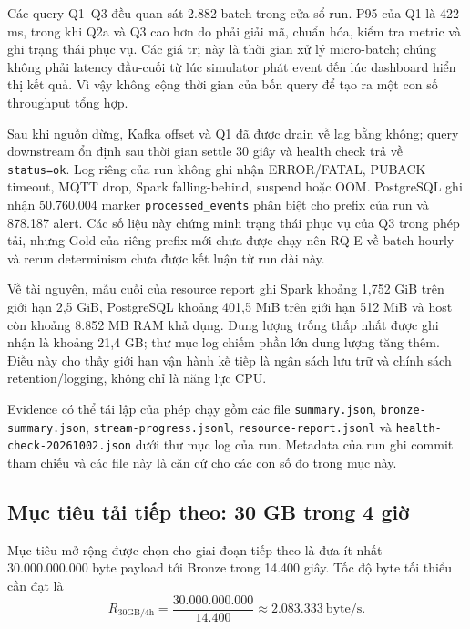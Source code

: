 Các query Q1--Q3 đều quan sát 2.882 batch trong cửa sổ run. P95 của Q1 là
422 ms, trong khi Q2a và Q3 cao hơn do phải giải mã, chuẩn hóa, kiểm tra
metric và ghi trạng thái phục vụ. Các giá trị này là thời gian xử lý
micro-batch; chúng không phải latency đầu-cuối từ lúc simulator phát event
đến lúc dashboard hiển thị kết quả. Vì vậy không cộng thời gian của bốn query
để tạo ra một con số throughput tổng hợp.

Sau khi nguồn dừng, Kafka offset và Q1 đã được drain về lag bằng không; query
downstream ổn định sau thời gian settle 30 giây và health check trả về
\texttt{status=ok}. Log riêng của run không ghi nhận ERROR/FATAL, PUBACK timeout,
MQTT drop, Spark falling-behind, suspend hoặc OOM. PostgreSQL ghi nhận
50.760.004 marker \texttt{processed\_events} phân biệt cho prefix của run và
878.187 alert. Các số liệu này chứng minh trạng thái phục vụ của Q3 trong
phép tải, nhưng Gold của riêng prefix mới chưa được chạy nên RQ-E về batch
hourly và rerun determinism chưa được kết luận từ run dài này.

Về tài nguyên, mẫu cuối của resource report ghi Spark khoảng 1,752 GiB
trên giới hạn 2,5 GiB, PostgreSQL khoảng 401,5 MiB trên giới hạn 512 MiB và
host còn khoảng 8.852 MB RAM khả dụng. Dung lượng trống thấp nhất được ghi
nhận là khoảng 21,4 GB; thư mục log chiếm phần lớn dung lượng tăng thêm.
Điều này cho thấy giới hạn vận hành kế tiếp là ngân sách lưu trữ và chính
sách retention/logging, không chỉ là năng lực CPU.

Evidence có thể tái lập của phép chạy gồm các file
\texttt{summary.json}, \texttt{bronze-summary.json},
\texttt{stream-progress.jsonl}, \texttt{resource-report.jsonl} và
\texttt{health-check-20261002.json} dưới thư mục log của run. Metadata của run ghi
commit tham chiếu và các file này là căn cứ cho các con số đo trong mục này.

\subsection{Mục tiêu tải tiếp theo: 30 GB trong 4 giờ}
\label{subsec:future-30gb}

Mục tiêu mở rộng được chọn cho giai đoạn tiếp theo là đưa ít nhất
30.000.000.000 byte payload tới Bronze trong 14.400 giây. Tốc độ byte tối
thiểu cần đạt là
\begin{equation}
  R_{30\mathrm{GB}/4\mathrm{h}} =
  \frac{30.000.000.000}{14.400}
  \approx 2.083.333\ \mathrm{byte/s}.
\end{equation}

